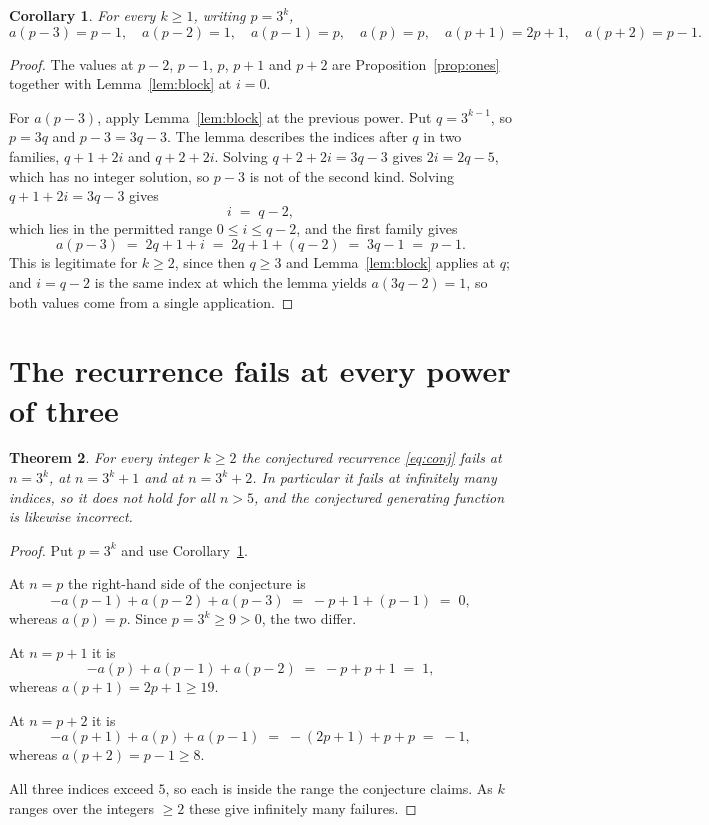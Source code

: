 \documentclass[11pt,a4paper]{article}
\theoremstyle{plain}
\newtheorem{theorem}{Theorem}
\newtheorem{corollary}[theorem]{Corollary}
\theoremstyle{definition}
\begin{document}
\begin{corollary}\label{cor:vals}
For every $k\ge1$, writing $p=3^{k}$,
\[
a(p-3)=p-1,\quad a(p-2)=1,\quad a(p-1)=p,\quad a(p)=p,\quad a(p+1)=2p+1,\quad a(p+2)=p-1 .
\]
\end{corollary}

\begin{proof}
The values at $p-2$, $p-1$, $p$, $p+1$ and $p+2$ are Proposition~\ref{prop:ones} together
with Lemma~\ref{lem:block} at $i=0$.

For $a(p-3)$, apply Lemma~\ref{lem:block} at the previous power. Put $q=3^{k-1}$, so
$p=3q$ and $p-3=3q-3$. The lemma describes the indices after $q$ in two families,
$q+1+2i$ and $q+2+2i$. Solving $q+2+2i=3q-3$ gives $2i=2q-5$, which has no integer
solution, so $p-3$ is not of the second kind. Solving $q+1+2i=3q-3$ gives
\[
i\;=\;q-2,
\]
which lies in the permitted range $0\le i\le q-2$, and the first family gives
\[
a(p-3)\;=\;2q+1+i\;=\;2q+1+(q-2)\;=\;3q-1\;=\;p-1 .
\]
This is legitimate for $k\ge2$, since then $q\ge3$ and Lemma~\ref{lem:block} applies at
$q$; and $i=q-2$ is the same index at which the lemma yields $a(3q-2)=1$, so both values
come from a single application.
\end{proof}

\section{The recurrence fails at every power of three}

\begin{theorem}
For every integer $k\ge2$ the conjectured recurrence \eqref{eq:conj} fails at $n=3^{k}$, at
$n=3^{k}+1$ and at $n=3^{k}+2$. In particular it fails at infinitely many indices, so it
does not hold for all $n>5$, and the conjectured generating function is likewise incorrect.
\end{theorem}

\begin{proof}
Put $p=3^{k}$ and use Corollary~\ref{cor:vals}.

At $n=p$ the right-hand side of the conjecture is
\[
-a(p-1)+a(p-2)+a(p-3)\;=\;-p+1+(p-1)\;=\;0,
\]
whereas $a(p)=p$. Since $p=3^{k}\ge9>0$, the two differ.

At $n=p+1$ it is
\[
-a(p)+a(p-1)+a(p-2)\;=\;-p+p+1\;=\;1,
\]
whereas $a(p+1)=2p+1\ge19$.

At $n=p+2$ it is
\[
-a(p+1)+a(p)+a(p-1)\;=\;-(2p+1)+p+p\;=\;-1,
\]
whereas $a(p+2)=p-1\ge8$.

All three indices exceed $5$, so each is inside the range the conjecture claims. As $k$
ranges over the integers $\ge2$ these give infinitely many failures.
\end{proof}
\end{document}
